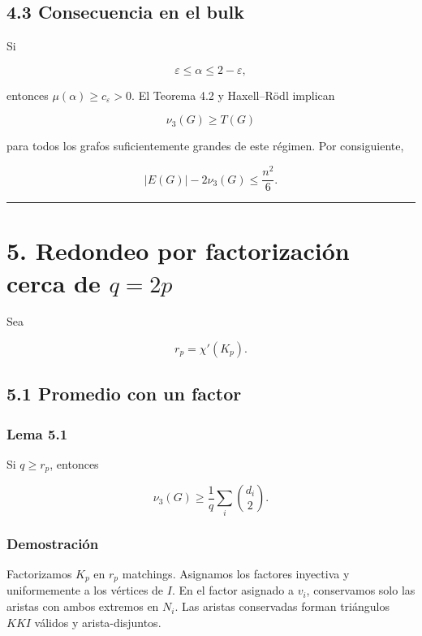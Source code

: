 \documentclass[
  11pt,
]{article}
\begin{document}
\subsection{4.3 Consecuencia en el bulk}\label{consecuencia-en-el-bulk}

Si

\[
\varepsilon\le\alpha\le2-\varepsilon,
\]

entonces \(\mu(\alpha)\ge c_\varepsilon>0\). El Teorema 4.2 y
Haxell--Rödl implican

\[
\nu_3(G)\ge T(G)
\]

para todos los grafos suficientemente grandes de este régimen. Por
consiguiente,

\[
|E(G)|-2\nu_3(G)
\le
\frac{n^2}{6}.
\tag{4.6}
\]

\begin{center}\rule{0.5\linewidth}{0.5pt}\end{center}

\section{\texorpdfstring{5. Redondeo por factorización cerca de
\(q=2p\)}{5. Redondeo por factorización cerca de q=2p}}\label{redondeo-por-factorizaciuxf3n-cerca-de-q2p}

Sea

\[
r_p=\chi'(K_p).
\]

\subsection{5.1 Promedio con un factor}\label{promedio-con-un-factor}

\subsubsection{Lema 5.1}\label{lema-5.1}

Si \(q\ge r_p\), entonces

\[
\boxed{
\nu_3(G)
\ge
\frac1q\sum_i\binom{d_i}{2}.
}
\tag{5.1}
\]

\subsubsection{Demostración}\label{demostraciuxf3n-3}

Factorizamos \(K_p\) en \(r_p\) matchings. Asignamos los factores
inyectiva y uniformemente a los vértices de \(I\). En el factor asignado
a \(v_i\), conservamos solo las aristas con ambos extremos en \(N_i\).
Las aristas conservadas forman triángulos \(KKI\) válidos y
arista-disjuntos.
\end{document}
